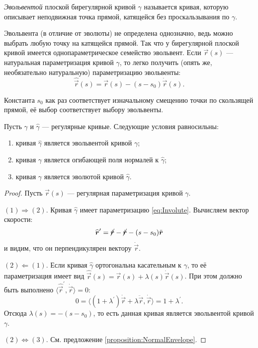 
\begin{definition}
	\textit{Эвольвентой} плоской бирегулярной кривой $\gamma$ называется кривая, которую описывает неподвижная точка прямой, катящейся без проскальзывания по $\gamma$.
\end{definition}

Эвольвента (в отличие от эволюты) не определена однозначно, ведь можно выбрать любую точку на катящейся прямой. Так что у бирегулярной плоской кривой имеется однопараметрическое семейство эвольвент. Если $\vec{r}(s)$ --- натуральная параметризация кривой $\gamma$, то легко получить (опять же, необязательно натуральную) параметризацию эвольвенты:
\begin{equation} \label{eq:Involute}
	\widehat{\vec{r}}(s) = \vec{r}(s) - (s - s_0)\dot{\vec{r}}(s).
\end{equation}

Константа $s_0$ как раз соответствует изначальному смещению точки по скользящей прямой, её выбор соответствует выбору эвольвенты.

\begin{theorem}
	Пусть $\gamma$ и $\widehat{\gamma}$ --- регулярные кривые. Следующие условия равносильны:
	\begin{enumerate}[nolistsep, label=(\arabic*)]
		\item кривая $\widehat{\gamma}$ является эвольвентой кривой $\gamma$;
		\item кривая $\gamma$ является огибающей поля нормалей к $\widehat{\gamma}$;
		\item кривая $\gamma$ является эволютой кривой $\widehat{\gamma}$.
	\end{enumerate}
\end{theorem}

\begin{proof}
	Пусть $\vec{r}(s)$ --- регулярная параметризация кривой $\gamma$.

	$(1) \Rightarrow (2)$. Кривая $\widehat{\gamma}$ имеет параметризацию \eqref{eq:Involute}. Вычисляем вектор скорости:
	\[
		\widehat{\vec{r}}^\prime = \cancel{\dot{\vec{r}}} - \cancel{\dot{\vec{r}}} - (s - s_0)\ddot{\vec{r}}
	\]
	и видим, что он перпендикулярен вектору $\dot{\vec{r}}$.

	$(2) \Leftarrow (1)$. Если кривая $\widehat{\gamma}$ ортогональна касательным к $\gamma$, то её параметризация имеет вид $\widehat{\vec{r}}(s) = \vec{r}(s) + \lambda(s)\dot{\vec{r}}(s)$. При этом должно быть выполнено $\langle\widehat{\vec{r}}^\prime, \dot{\vec{r}}\rangle = 0$:
	\[
		0 = \langle (1 + \lambda^\prime)\dot{\vec{r}} + \lambda\ddot{\vec{r}}, \dot{\vec{r}}\rangle = 1 + \lambda^\prime.
	\]
	Отсюда $\lambda(s) = -(s - s_0)$, то есть данная кривая является эвольвентой кривой $\gamma$.

	$(2) \Leftrightarrow (3)$. См. предложение \ref{proposition:NormalEnvelope}.
\end{proof}

